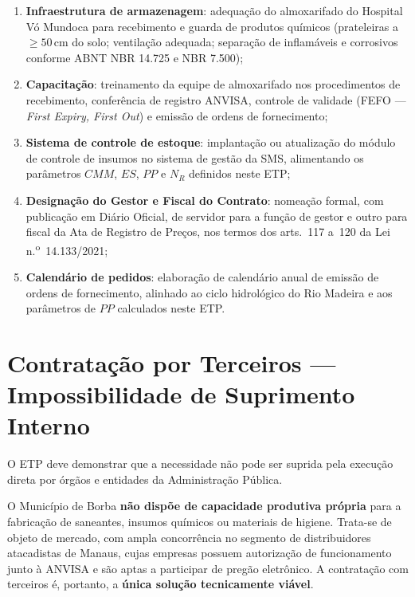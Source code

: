 \documentclass[12pt,a4paper]{article}
\newcommand{\art}[1]{art.\,#1}
\begin{document}
\begin{enumerate}
  \item \textbf{Infraestrutura de armazenagem}: adequação do almoxarifado do Hospital
    Vó Mundoca para recebimento e guarda de produtos químicos (prateleiras a $\geq 50$\,cm
    do solo; ventilação adequada; separação de inflamáveis e corrosivos conforme ABNT
    NBR 14.725 e NBR 7.500);
  \item \textbf{Capacitação}: treinamento da equipe de almoxarifado nos procedimentos
    de recebimento, conferência de registro ANVISA, controle de validade (FEFO ---
    \textit{First Expiry, First Out}) e emissão de ordens de fornecimento;
  \item \textbf{Sistema de controle de estoque}: implantação ou atualização do módulo
    de controle de insumos no sistema de gestão da SMS, alimentando os parâmetros
    $CMM$, $ES$, $PP$ e $N_R$ definidos neste ETP;
  \item \textbf{Designação do Gestor e Fiscal do Contrato}: nomeação formal, com
    publicação em Diário Oficial, de servidor para a função de gestor e outro para
    fiscal da Ata de Registro de Preços, nos termos dos arts.~117 a~120 da Lei
    n.\textsuperscript{o}~14.133/2021;
  \item \textbf{Calendário de pedidos}: elaboração de calendário anual de emissão de
    ordens de fornecimento, alinhado ao ciclo hidrológico do Rio Madeira e aos
    parâmetros de $PP$ calculados neste ETP.
\end{enumerate}

\section{Contratação por Terceiros --- Impossibilidade de Suprimento Interno}

\begin{legalbox}[Base Legal --- \art{18}, IX, Lei n.\textsuperscript{o} 14.133/2021]
\small
O ETP deve demonstrar que a necessidade não pode ser suprida pela execução direta por órgãos e entidades da Administração Pública.
\end{legalbox}

O Município de Borba \textbf{não dispõe de capacidade produtiva própria} para a fabricação
de saneantes, insumos químicos ou materiais de higiene. Trata-se de objeto de mercado,
com ampla concorrência no segmento de distribuidores atacadistas de Manaus, cujas
empresas possuem autorização de funcionamento junto à ANVISA e são aptas a participar
de pregão eletrônico. A contratação com terceiros é, portanto, a \textbf{única solução
tecnicamente viável}.
\end{document}
